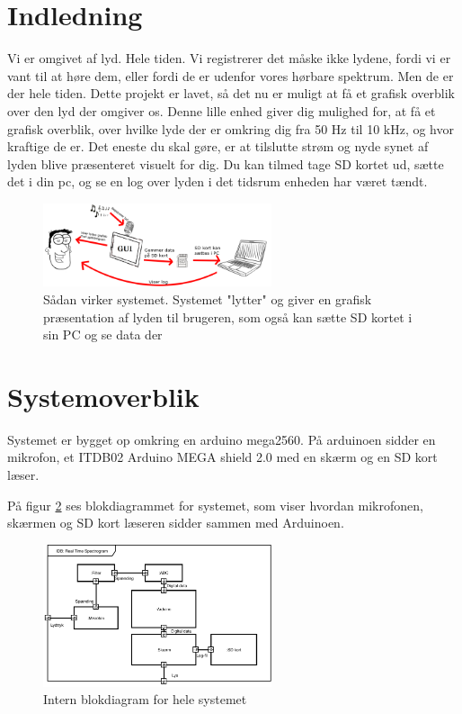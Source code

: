 %

%
	
\section{Indledning}
Vi er omgivet af lyd. Hele tiden. Vi registrerer det måske ikke lydene, fordi vi er vant til at høre dem, eller fordi de er udenfor vores hørbare spektrum. Men de er der hele tiden.
Dette projekt er lavet, så det nu er muligt at få et grafisk overblik over den lyd der omgiver os.
Denne lille enhed giver dig mulighed for, at få et grafisk overblik, over hvilke lyde der er omkring dig fra 50 Hz til 10 kHz, og hvor kraftige de er.
Det eneste du skal gøre, er at tilslutte strøm og nyde synet af lyden blive præsenteret visuelt for dig.
Du kan tilmed tage SD kortet ud, sætte det i din pc, og se en log over lyden i det tidsrum enheden har været tændt.

\begin{figure}[H]
	\center
	\includegraphics[width = 0.6\textwidth]{Figur/Rigt_billede.png}
	\caption{Sådan virker systemet. Systemet "lytter" og giver en grafisk præsentation af lyden til brugeren, som også kan sætte SD kortet i sin PC og se data der}
	\label{fig:ibd}
\end{figure}


\section{Systemoverblik}
Systemet er bygget op omkring en arduino mega2560. På arduinoen sidder en mikrofon, et ITDB02 Arduino MEGA shield 2.0 med en skærm og en SD kort læser.

På figur \ref{fig:ibd} ses blokdiagrammet for systemet, som viser hvordan mikrofonen, skærmen og SD kort læseren sidder sammen med Arduinoen.

\begin{figure}[H]
	\center
	\includegraphics[width = 0.6\textwidth]{Figur/IBD.pdf}
	\caption{Intern blokdiagram for hele systemet}
	\label{fig:ibd}
\end{figure}

